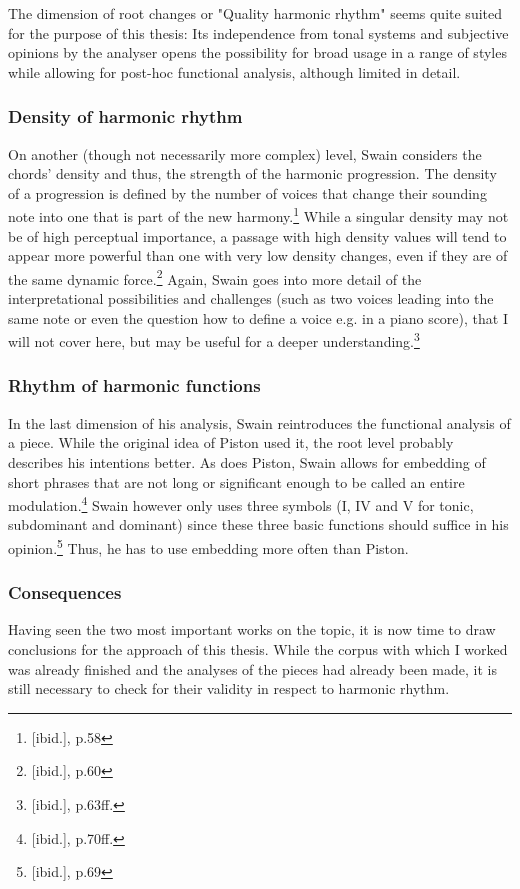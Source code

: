 \documentclass[a4paper,12pt]{report}
\begin{document}
The dimension of root changes or "Quality harmonic rhythm" seems quite suited for the purpose of this thesis: Its independence from tonal systems and subjective opinions by the analyser opens the possibility for broad usage in a range of styles while allowing for post-hoc functional analysis, although limited in detail.

\subsubsection{Density of harmonic rhythm}
On another (though not necessarily more complex) level, Swain considers the chords' density and thus, the strength of the harmonic progression. The density of a progression is defined by the number of voices that change their sounding note into one that is part of the new harmony.\footnote{[ibid.], p.58} While a singular density may not be of high perceptual importance, a passage with high density values will tend to appear more powerful than one with very low density changes, even if they are of the same dynamic force.\footnote{[ibid.], p.60} Again, Swain goes into more detail of the interpretational possibilities and challenges (such as two voices leading into the same note or even the question how to define a voice e.g. in a piano score), that I will not cover here, but may be useful for a deeper understanding.\footnote{[ibid.], p.63ff.}

\subsubsection{Rhythm of harmonic functions}
In the last dimension of his analysis, Swain reintroduces the functional analysis of a piece. While the original idea of Piston used it, the root level probably describes his intentions better. As does Piston, Swain allows for embedding of short phrases that are not long or significant enough to be called an entire modulation.\footnote{[ibid.], p.70ff.} Swain however only uses three symbols (I, IV and V for tonic, subdominant and dominant) since these three basic functions should suffice in his opinion.\footnote{[ibid.], p.69} Thus, he has to use embedding more often than Piston.

\subsubsection{Consequences}
Having seen the two most important works on the topic, it is now time to draw conclusions for the approach of this thesis. While the corpus with which I worked was already finished and the analyses of the pieces had already been made, it is still necessary to check for their validity in respect to harmonic rhythm.
\end{document}

